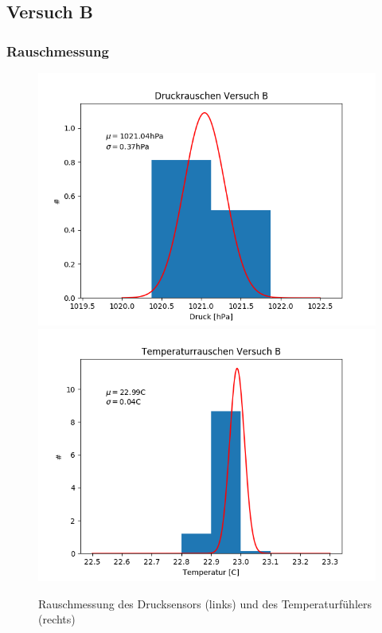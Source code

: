 \documentclass[12pt,a4paper]{article}
\begin{document}




\subsection{Versuch B}

\subsubsection{Rauschmessung}

\begin{figure}
\includegraphics[scale=0.5]{Bilder/DruckrauschenB}
\includegraphics[scale=0.5]{Bilder/TemprauschenB}
\caption[Rauschmessung Versuch B]{Rauschmessung des Drucksensors (links) und des Temperaturfühlers (rechts)}
\label{fig:RauschenB}
\end{figure}
\end{document}
